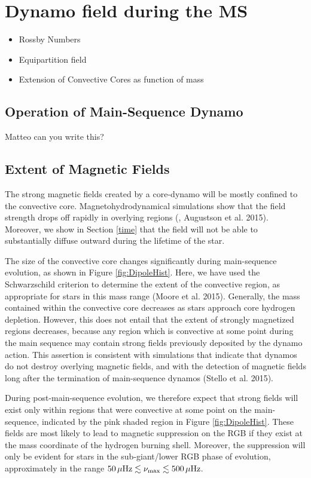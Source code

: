 \section{Dynamo field during the MS}
\begin{itemize}
\item Rossby Numbers
\item Equipartition field
\item Extension of Convective Cores as function of mass
\end{itemize}


\subsection{Operation of Main-Sequence Dynamo}

Matteo can you write this?

\subsection{Extent of Magnetic Fields}

The strong magnetic fields created by a core-dynamo will be mostly confined to the convective core. Magnetohydrodynamical simulations show that the field strength drops off rapidly in overlying regions (\citealt{Featherstone_2009}, Augustson et al. 2015). Moreover, we show in Section \ref{time} that the field will not be able to substantially diffuse outward during the lifetime of the star. 

The size of the convective core changes significantly during main-sequence evolution, as shown in Figure \ref{fig:DipoleHist}. Here, we have used the Schwarzschild criterion to determine the extent of the convective region, as appropriate for stars in this mass range (Moore et al. 2015). Generally, the mass contained within the convective core decreases as stars approach core hydrogen depletion. However, this does not entail that the extent of strongly magnetized regions decreases, because any region which is convective at some point during the main sequence may contain strong fields previously deposited by the dynamo action. This assertion is consistent with simulations \citep{Featherstone_2009} that indicate that dynamos do not destroy overlying magnetic fields, and with the detection of magnetic fields long after the termination of main-sequence dynamos (Stello et al. 2015).

During post-main-sequence evolution, we therefore expect that strong fields will exist only within regions that were convective at some point on the main-sequence, indicated by the pink shaded region in Figure \ref{fig:DipoleHist}. These fields are most likely to lead to magnetic suppression on the RGB if they exist at the mass coordinate of the hydrogen burning shell. Moreover, the suppression will only be evident for stars in the sub-giant/lower RGB phase of evolution, approximately in the range $50 \, \mu {\rm Hz} \lesssim \nu_{\rm max} \lesssim 500 \, \mu {\rm Hz}$.


